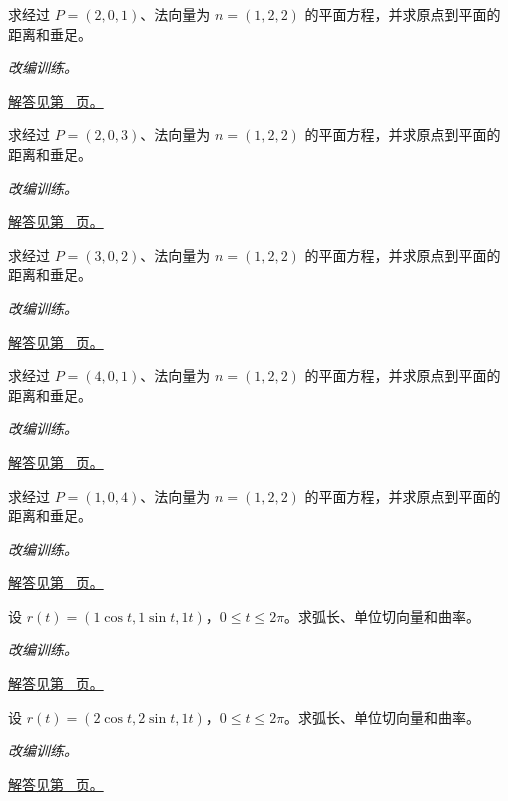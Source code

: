 \documentclass[UTF8,12pt,a4paper,fontset=fandol]{ctexart}
\begin{document}
\begin{example}[平面方程与点面距离]\label{ex:c31q8}
求经过 $P=(2,0,1)$、法向量为 $n=(1,2,2)$ 的平面方程，并求原点到平面的距离和垂足。
\par\textit{改编训练。}\par\hyperref[ans:c31q8]{解答见第~\pageref{ans:c31q8} 页。}
\end{example}
\begin{example}[平面方程与点面距离]\label{ex:c31q9}
求经过 $P=(2,0,3)$、法向量为 $n=(1,2,2)$ 的平面方程，并求原点到平面的距离和垂足。
\par\textit{改编训练。}\par\hyperref[ans:c31q9]{解答见第~\pageref{ans:c31q9} 页。}
\end{example}
\begin{example}[平面方程与点面距离]\label{ex:c31q10}
求经过 $P=(3,0,2)$、法向量为 $n=(1,2,2)$ 的平面方程，并求原点到平面的距离和垂足。
\par\textit{改编训练。}\par\hyperref[ans:c31q10]{解答见第~\pageref{ans:c31q10} 页。}
\end{example}
\begin{example}[平面方程与点面距离]\label{ex:c31q11}
求经过 $P=(4,0,1)$、法向量为 $n=(1,2,2)$ 的平面方程，并求原点到平面的距离和垂足。
\par\textit{改编训练。}\par\hyperref[ans:c31q11]{解答见第~\pageref{ans:c31q11} 页。}
\end{example}
\begin{example}[平面方程与点面距离]\label{ex:c31q12}
求经过 $P=(1,0,4)$、法向量为 $n=(1,2,2)$ 的平面方程，并求原点到平面的距离和垂足。
\par\textit{改编训练。}\par\hyperref[ans:c31q12]{解答见第~\pageref{ans:c31q12} 页。}
\end{example}
\begin{example}[圆柱螺线的弧长与曲率]\label{ex:c31q13}
设 $r(t)=(1\cos t,1\sin t,1t)$，$0\le t\le2\pi$。求弧长、单位切向量和曲率。
\par\textit{改编训练。}\par\hyperref[ans:c31q13]{解答见第~\pageref{ans:c31q13} 页。}
\end{example}
\begin{example}[圆柱螺线的弧长与曲率]\label{ex:c31q14}
设 $r(t)=(2\cos t,2\sin t,1t)$，$0\le t\le2\pi$。求弧长、单位切向量和曲率。
\par\textit{改编训练。}\par\hyperref[ans:c31q14]{解答见第~\pageref{ans:c31q14} 页。}
\end{example}
\end{document}
